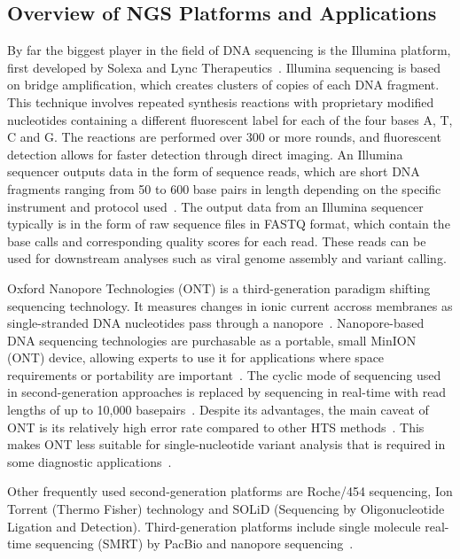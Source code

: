 \subsection{Overview of NGS Platforms and Applications}
By far the biggest player in the field of DNA sequencing is the Illumina platform, first developed by Solexa and Lync Therapeutics~\cite{illumina2015introduction}. Illumina sequencing is based on bridge amplification, which creates clusters of copies of each DNA fragment. This technique involves repeated synthesis reactions with proprietary modified nucleotides containing a different fluorescent label for each of the four bases A, T, C and G. The reactions are performed over 300 or more rounds, and fluorescent detection allows for faster detection through direct imaging. An Illumina sequencer outputs data in the form of sequence reads, which are short DNA fragments ranging from 50 to 600 base pairs in length depending on the specific instrument and protocol used~\cite{illumina2015introduction, slatko2018overview, mardis2008next}. The output data from an Illumina sequencer typically is in the form of raw sequence files in FASTQ format, which contain the base calls and corresponding quality scores for each read. These reads can be used for downstream analyses such as viral genome assembly and variant calling.

Oxford Nanopore Technologies (ONT) is a third-generation paradigm shifting sequencing technology. It measures changes in ionic current accross membranes as single-stranded DNA nucleotides pass through a nanopore~\cite{jain2016oxford}. Nanopore-based DNA sequencing technologies are purchasable as a portable, small MinION (ONT) device, allowing experts to use it for applications where space requirements or portability are important~\cite{greninger2015rapid, jain2016oxford}. The cyclic mode of sequencing used in second-generation approaches is replaced by sequencing in real-time with read lengths of up to 10,000 basepairs~\cite{jain2016oxford}. Despite its advantages, the main caveat of ONT is its relatively high error rate compared to other HTS methods~\cite{fu2019comparative}. This makes ONT less suitable for single-nucleotide variant analysis that is required in some diagnostic applications~\cite{bowden2019sequencing, stefan2022comparison}.

Other frequently used second-generation platforms are Roche/454 sequencing, Ion Torrent (Thermo Fisher) technology and SOLiD (Sequencing by Oligonucleotide Ligation and Detection). Third-generation platforms include single molecule real-time sequencing (SMRT) by PacBio and nanopore sequencing~\cite{rhoads2015pacbio}. 

